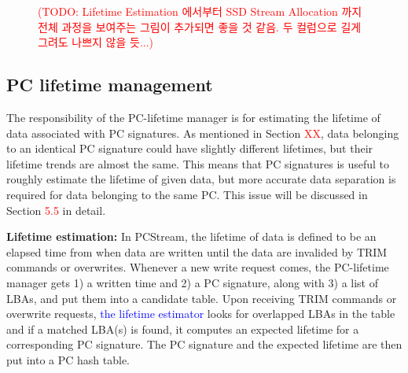 


\begin{figure}[t]
\centering
\begin{pgfpicture}
\end{pgfpicture}
\caption{\textcolor{red}{(TODO: Lifetime Estimation 에서부터 SSD Stream Allocation 까지 전체 과정을 
보여주는 그림이 추가되면 좋을 것 같음. 두 컬럼으로 길게 그려도 나쁘지 않을 듯...)}}
\label{fig:process}
\end{figure}

\subsection{PC lifetime management}
The responsibility of the PC-lifetime manager is for estimating the lifetime of
data associated with PC signatures. As mentioned in Section
\textcolor{red}{XX}, data belonging to an identical PC signature could have
slightly different lifetimes, but their lifetime trends are almost the same.
This means that PC signatures is useful to roughly estimate the lifetime of
given data, but more accurate data separation is required for data belonging to
the same PC.  This issue will be discussed in Section \textcolor{red}{5.5} in
detail.

\textbf{Lifetime estimation:}
In \textsf{PCStream}, the lifetime of data is defined to be an elapsed time
from when data are written until the data are invalided by TRIM commands or
overwrites. Whenever a new write request comes, the PC-lifetime manager gets 1)
a written time and 2) a PC signature, along with 3) a list of LBAs, and put
them into a candidate table. Upon receiving TRIM commands or overwrite
requests, \textcolor{blue}{the lifetime estimator} looks for overlapped LBAs in
the table and if a matched LBA(s) is found, it computes an expected lifetime
for a corresponding PC signature. The PC signature and the expected lifetime
are then put into a PC hash table.

